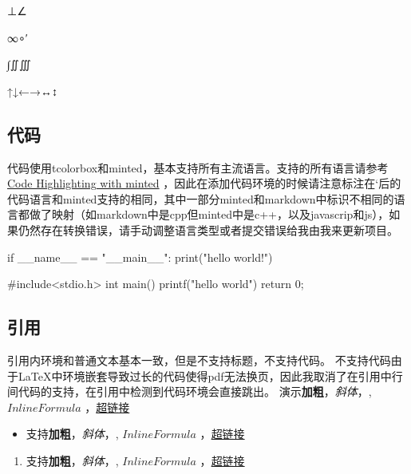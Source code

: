 \documentclass{article}
\begin{document}
⊥∠


∞∘′


∫∬∭


↑↓←→↔↕


\subsection{代码}


代码使用tcolorbox和minted，基本支持所有主流语言。支持的所有语言请参考 \href{https://www.overleaf.com/learn/latex/Code_Highlighting_with_minted}{Code Highlighting with minted} ，因此在添加代码环境的时候请注意标注在\inlang{\small{}}`后的代码语言和minted支持的相同，其中一部分minted和markdown中标识不相同的语言都做了映射（如markdown中是cpp但minted中是c++，以及javascrip和js），如果仍然存在转换错误，请手动调整语言类型或者提交错误给我由我来更新项目。


\begin{langbox}[Python]
if __name__ == "__main__":
    print("hello world!")
\end{langbox}



\begin{langbox}[C++]
#include<stdio.h>
int main(){
    printf("hello world")
    return 0;
}

\end{langbox}



\subsection{引用}


\begin{markquote}

引用内环境和普通文本基本一致，但是不支持标题，不支持代码。
不支持代码由于LaTeX中环境嵌套导致过长的代码使得pdf无法换页，因此我取消了在引用中行间代码的支持，在引用中检测到代码环境会直接跳出。
演示\textbf{加粗}，\textit{斜体}，, $Inline Formula$ ，\href{http:///www.github.com}{超链接}




\begin{itemize}
\item
支持\textbf{加粗}，\textit{斜体}，, $Inline Formula$ ，\href{http:///www.github.com}{超链接}
\end{itemize}


\begin{enumerate}
\item
支持\textbf{加粗}，\textit{斜体}，, $Inline Formula$ ，\href{http:///www.github.com}{超链接}
\end{enumerate}







\end{markquote}
\end{document}
